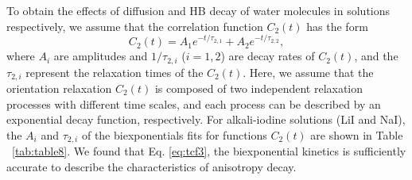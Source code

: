 {To obtain the effects of diffusion and HB decay of water molecules
in solutions respectively, we assume that 
the correlation function $C_2(t)$ has the form\cite{TanHS2005}
\begin{equation}
C_2(t)=A_1e^{-t/\tau_{2,1}} +A_2e^{-t/\tau_{2,2}},
\label{eq:tcf3}
\end{equation}
where $A_i$ are amplitudes and $1/\tau_{2,i}$ ($i=1, 2$) are decay rates of $C_2(t)$,
and the $\tau_{2,i}$ represent the relaxation times of the $C_2(t)$. 
Here, we assume that the orientation relaxation $C_2(t)$ is composed of two independent relaxation processes 
with different time scales, and each process can be described by an exponential decay function, respectively.
For alkali-iodine solutions (LiI and NaI), the $A_i$ and $\tau_{2,i}$ of the biexponentials fits for functions 
$C_2(t)$ are shown in Table ~\ref{tab:table8}.
We found that Eq. \ref{eq:tcf3}, the biexponential kinetics is sufficiently accurate to 
describe the characteristics of anisotropy decay.                        
%

}
